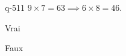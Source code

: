 \begin{truefalse}{q-511}
$9\times 7 = 63 \implies 6\times 8 = 46$.
\item Vrai
\item* Faux
\end{truefalse}

